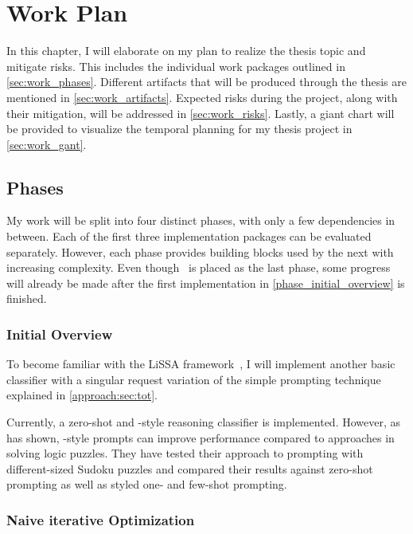 \chapter{Work Plan}
\label{chap:work_plan}

In this chapter, I will elaborate on my plan to realize the thesis topic and mitigate risks.
This includes the individual work packages outlined in \autoref{sec:work_phases}.
Different artifacts that will be produced through the thesis are mentioned in \autoref{sec:work_artifacts}.
Expected risks during the project, along with their mitigation, will be addressed in \autoref{sec:work_risks}.
Lastly, a giant chart will be provided to visualize the temporal planning for my thesis project in \autoref{sec:work_gant}.

\section{Phases}
\label{sec:work_phases}

My work will be split into four distinct phases, with only a few dependencies in between.
Each of the first three implementation packages can be evaluated separately.
However, each phase provides building blocks used by the next with increasing complexity.
Even though~ is placed as the last phase, some progress will already be made after the first implementation in \autoref{phase_initial_overview} is finished.


\subsection{Initial Overview}
\label{phase_initial_overview}

To become familiar with the LiSSA framework~\cite{fuchss2025LiSSAGeneric}, I will implement another basic classifier with a singular request variation of the simple prompting technique \ToT~\cite{long2023LargeLanguage} explained in \autoref{approach:sec:tot}.

Currently, a zero-shot and \CoT-style reasoning classifier is implemented.
However, as \citeauthor{long2023LargeLanguage} has shown, \ToT-style prompts can improve performance compared to \CoT approaches in solving logic puzzles.
They have tested their approach to \ToT prompting with different-sized Sudoku puzzles and compared their results against zero-shot prompting as well as \CoT styled one- and few-shot prompting.


\subsection{Naive iterative Optimization}
\label{phase_naive_iterative}

